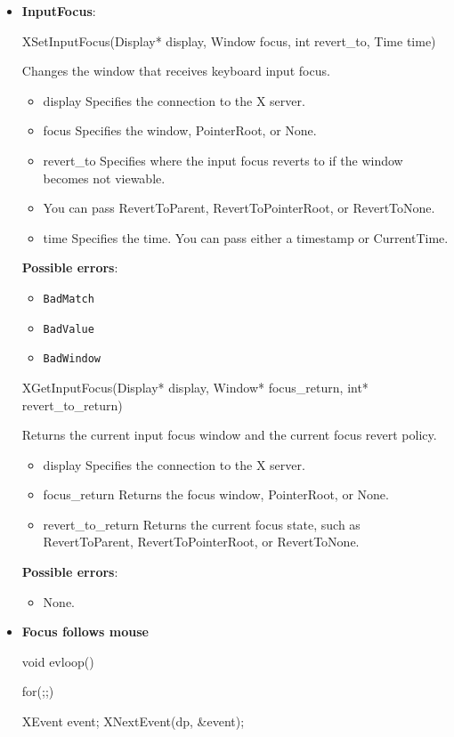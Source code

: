 \documentclass{report}
\begin{document}
\begin{itemize}
        \item \textbf{InputFocus}:
            \bigbreak \noindent 
            \begin{cppcode}
                XSetInputFocus(Display* display, Window focus, int revert_to, Time time)
            \end{cppcode}
            \bigbreak \noindent
            Changes the window that receives keyboard input focus.
            \begin{itemize}
                \item display Specifies the connection to the X server.
                \item focus Specifies the window, PointerRoot, or None.
                \item revert\_to Specifies where the input focus reverts to if the window becomes not viewable.
                \item You can pass RevertToParent, RevertToPointerRoot, or RevertToNone.
                \item time Specifies the time. You can pass either a timestamp or CurrentTime.
            \end{itemize}
            \textbf{Possible errors}:
            \begin{itemize}
                \item \texttt{BadMatch}
                \item \texttt{BadValue}
                \item \texttt{BadWindow}
            \end{itemize}
            \bigbreak \noindent 
            \begin{cppcode}
                XGetInputFocus(Display* display, Window* focus_return, int* revert_to_return)
            \end{cppcode}
            \bigbreak \noindent
            Returns the current input focus window and the current focus revert policy.
            \begin{itemize}
                \item display Specifies the connection to the X server.
                \item focus\_return Returns the focus window, PointerRoot, or None.
                \item revert\_to\_return Returns the current focus state, such as RevertToParent, RevertToPointerRoot, or RevertToNone.
            \end{itemize}
            \textbf{Possible errors}:
            \begin{itemize}
                \item None.
            \end{itemize}
        \item \textbf{Focus follows mouse} 
            \bigbreak \noindent 
            \begin{cppcode}
                void evloop() {
                    for(;;) {
                        XEvent event;
                        XNextEvent(dp, &event);

}}
\end{cppcode}
\end{itemize}
\end{document}

